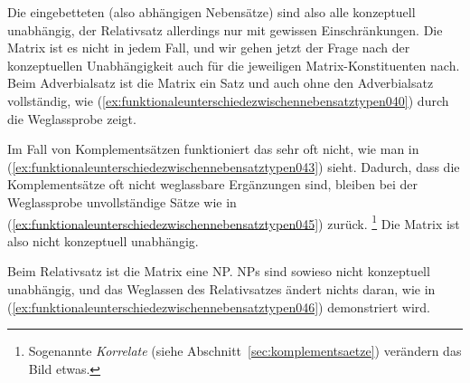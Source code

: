 Die eingebetteten (also abhängigen Nebensätze) sind also alle konzeptuell unabhängig, der Relativsatz allerdings nur mit gewissen Einschränkungen.
Die Matrix ist es nicht in jedem Fall, und wir gehen jetzt der Frage nach der konzeptuellen Unabhängigkeit auch für die jeweiligen Matrix-Konstituenten nach.
Beim Adverbialsatz ist die Matrix ein Satz und auch ohne den Adverbialsatz vollständig, wie (\ref{ex:funktionaleunterschiedezwischennebensatztypen040}) durch die Weglassprobe zeigt.

\begin{exe}
  \ex\label{ex:funktionaleunterschiedezwischennebensatztypen040}
    \begin{xlist}
    \end{xlist}
\end{exe}

Im Fall von Komplementsätzen funktioniert das sehr oft nicht, wie man in (\ref{ex:funktionaleunterschiedezwischennebensatztypen043}) sieht.
Dadurch, dass die Komplementsätze oft nicht weglassbare Ergänzungen sind, bleiben bei der Weglassprobe unvollständige Sätze wie in (\ref{ex:funktionaleunterschiedezwischennebensatztypen045}) zurück.%
\footnote{Sogenannte \textit{Korrelate} (siehe Abschnitt~\ref{sec:komplementsaetze}) verändern das Bild etwas.}
Die Matrix ist also nicht konzeptuell unabhängig.

\begin{exe}
    \ex\label{ex:funktionaleunterschiedezwischennebensatztypen043}
    \begin{xlist}
    \end{xlist}
\end{exe}

Beim Relativsatz ist die Matrix eine NP.
NPs sind sowieso nicht konzeptuell unabhängig, und das Weglassen des Relativsatzes ändert nichts daran, wie in (\ref{ex:funktionaleunterschiedezwischennebensatztypen046}) demonstriert wird.

\Np

\begin{exe}
  \ex\label{ex:funktionaleunterschiedezwischennebensatztypen046}
    \begin{xlist}
    \end{xlist}
\end{exe}

